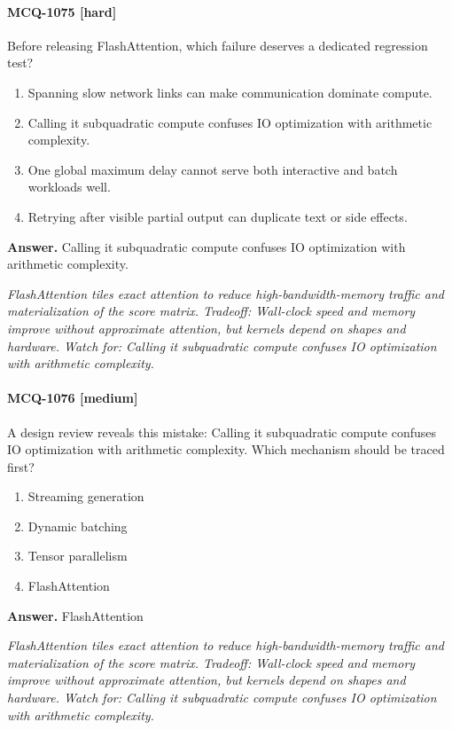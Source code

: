 \paragraph{MCQ-1075 [hard]} Before releasing FlashAttention, which failure deserves a dedicated regression test?
\begin{enumerate}[label=\Alph*.]
\item Spanning slow network links can make communication dominate compute.
\item Calling it subquadratic compute confuses IO optimization with arithmetic complexity.
\item One global maximum delay cannot serve both interactive and batch workloads well.
\item Retrying after visible partial output can duplicate text or side effects.
\end{enumerate}
\noindent\textbf{Answer.} Calling it subquadratic compute confuses IO optimization with arithmetic complexity.
\par\textit{FlashAttention tiles exact attention to reduce high-bandwidth-memory traffic and materialization of the score matrix. Tradeoff: Wall-clock speed and memory improve without approximate attention, but kernels depend on shapes and hardware. Watch for: Calling it subquadratic compute confuses IO optimization with arithmetic complexity.}
\paragraph{MCQ-1076 [medium]} A design review reveals this mistake: Calling it subquadratic compute confuses IO optimization with arithmetic complexity. Which mechanism should be traced first?
\begin{enumerate}[label=\Alph*.]
\item Streaming generation
\item Dynamic batching
\item Tensor parallelism
\item FlashAttention
\end{enumerate}
\noindent\textbf{Answer.} FlashAttention
\par\textit{FlashAttention tiles exact attention to reduce high-bandwidth-memory traffic and materialization of the score matrix. Tradeoff: Wall-clock speed and memory improve without approximate attention, but kernels depend on shapes and hardware. Watch for: Calling it subquadratic compute confuses IO optimization with arithmetic complexity.}

